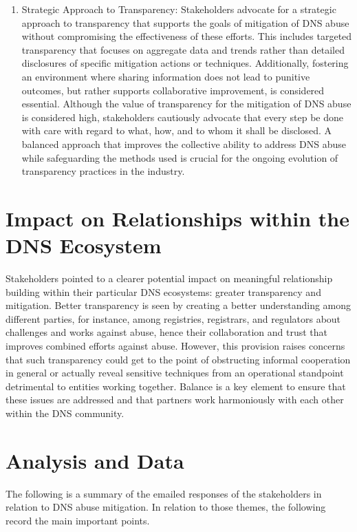 \begin{enumerate}
    \item Strategic Approach to Transparency: Stakeholders advocate for a strategic approach to transparency that supports the goals of mitigation of DNS abuse without compromising the effectiveness of these efforts. This includes targeted transparency that focuses on aggregate data and trends rather than detailed disclosures of specific mitigation actions or techniques. Additionally, fostering an environment where sharing information does not lead to punitive outcomes, but rather supports collaborative improvement, is considered essential. Although the value of transparency for the mitigation of DNS abuse is considered high, stakeholders cautiously advocate that every step be done with care with regard to what, how, and to whom it shall be disclosed. A balanced approach that improves the collective ability to address DNS abuse while safeguarding the methods used is crucial for the ongoing evolution of transparency practices in the industry.

\end{enumerate}

\section{Impact on Relationships within the DNS Ecosystem} 

 Stakeholders pointed to a clearer potential impact on meaningful relationship building within their particular DNS ecosystems: greater transparency and mitigation. Better transparency is seen by creating a better understanding among different parties, for instance, among registries, registrars, and regulators about challenges and works against abuse, hence their collaboration and trust that improves combined efforts against abuse. However, this provision raises concerns that such transparency could get to the point of obstructing informal cooperation in general or actually reveal sensitive techniques from an operational standpoint detrimental to entities working together. Balance is a key element to ensure that these issues are addressed and that partners work harmoniously with each other within the DNS community.

\section{Analysis and Data } 

The following is a summary of the emailed responses of the stakeholders in relation to DNS abuse mitigation. In relation to those themes, the following record the main important points.


